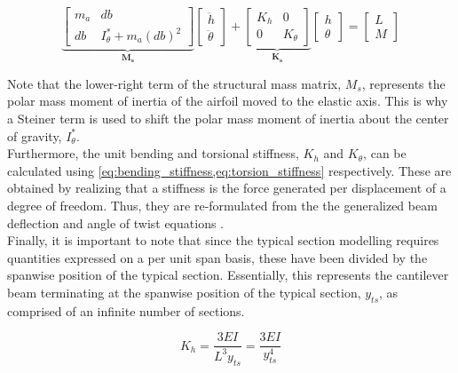\begin{equation}
    \label{eq:struct_model}
    \underbrace{\begin{bmatrix}
        m_a & db \\
        db & I_\theta^* + m_a\left(db\right)^2
    \end{bmatrix}}_{\bm{M_s}}
    \begin{bmatrix}
        \ddot{h} \\ \ddot{\theta}
    \end{bmatrix} +
    \underbrace{\begin{bmatrix}
        K_h & 0 \\
        0 & K_\theta
    \end{bmatrix}}_{\bm{K_s}}
    \begin{bmatrix}
        h \\ \theta
    \end{bmatrix} =
    \begin{bmatrix}
        L \\ M
    \end{bmatrix}
\end{equation}

Note that the lower-right term of the structural mass matrix, $M_s$, represents
the polar mass moment of inertia of the airfoil moved to the elastic axis. This
is why a Steiner term is used to shift the polar mass moment of inertia about
the center of gravity, $I_\theta^*$.\\

Furthermore, the unit bending and torsional stiffness, $K_h$ and $K_\theta$,
can be calculated using \cref{eq:bending_stiffness,eq:torsion_stiffness}
respectively. These are obtained by realizing that a stiffness is the force
generated per displacement of a degree of freedom. Thus, they are re-formulated
from the the generalized beam deflection and angle of twist equations
\autocite[p.865]{hibbelerMechanicsMaterials2011}.\\

Finally, it is important to note that since the typical section modelling
requires quantities expressed on a per unit span basis, these have been divided
by the spanwise position of the typical section. Essentially, this represents
the cantilever beam terminating at the spanwise position of the typical
section, $y_{ts}$, as comprised of an infinite number of sections.

\begin{equation}
    \label{eq:bending_stiffness}
    K_h = \frac{3EI}{L^3 y_{ts}} = \frac{3EI}{y_{ts}^4}
\end{equation}

